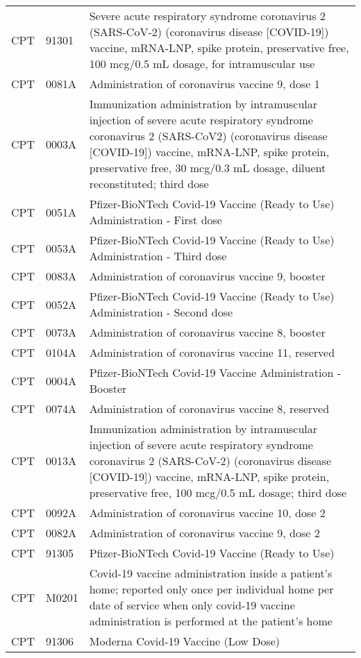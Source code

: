 \begin{longtable}{p{}p{}p{}}
  CPT & 91301 & Severe acute respiratory syndrome coronavirus 2 (SARS-CoV-2) (coronavirus disease [COVID-19]) vaccine, mRNA-LNP, spike protein, preservative free, 100 mcg/0.5 mL dosage, for intramuscular use \\ 
  CPT & 0081A & Administration of coronavirus vaccine 9, dose 1 \\ 
  CPT & 0003A & Immunization administration by intramuscular injection of severe acute respiratory syndrome coronavirus 2 (SARS-CoV2) (coronavirus disease [COVID-19]) vaccine, mRNA-LNP, spike protein, preservative free, 30 mcg/0.3 mL dosage, diluent reconstituted; third dose \\ 
  CPT & 0051A & Pfizer-BioNTech Covid-19 Vaccine (Ready to Use) Administration - First dose \\ 
  CPT & 0053A & Pfizer-BioNTech Covid-19 Vaccine (Ready to Use) Administration - Third dose \\ 
  CPT & 0083A & Administration of coronavirus vaccine 9, booster \\ 
  CPT & 0052A & Pfizer-BioNTech Covid-19 Vaccine (Ready to Use) Administration - Second dose \\ 
  CPT & 0073A & Administration of coronavirus vaccine 8, booster \\ 
  CPT & 0104A & Administration of coronavirus vaccine 11, reserved \\ 
  CPT & 0004A & Pfizer-BioNTech Covid-19 Vaccine Administration - Booster \\ 
  CPT & 0074A & Administration of coronavirus vaccine 8, reserved \\ 
  CPT & 0013A & Immunization administration by intramuscular injection of severe acute respiratory syndrome coronavirus 2 (SARS-CoV-2) (coronavirus disease [COVID-19]) vaccine, mRNA-LNP, spike protein, preservative free, 100 mcg/0.5 mL dosage; third dose \\ 
  CPT & 0092A & Administration of coronavirus vaccine 10, dose 2 \\ 
  CPT & 0082A & Administration of coronavirus vaccine 9, dose 2 \\ 
  CPT & 91305 & Pfizer-BioNTech Covid-19 Vaccine (Ready to Use) \\ 
  CPT & M0201 & Covid-19 vaccine administration inside a patient's home; reported only once per individual home per date of service when only covid-19 vaccine administration is performed at the patient's home \\ 
  CPT & 91306 & Moderna Covid-19 Vaccine (Low Dose) \\ 

\end{longtable}
